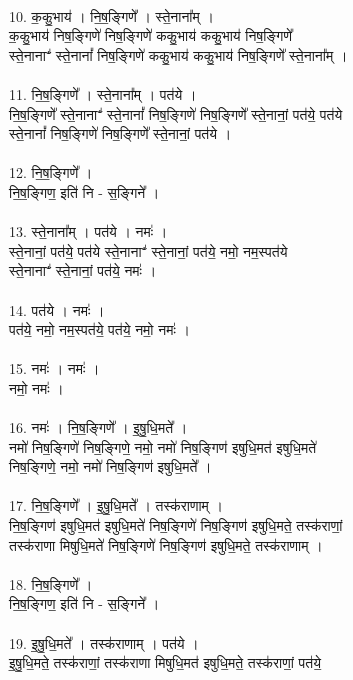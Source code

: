 \\
10. क॒कु॒भाय॑ । नि॒ष॒ङ्गिणे᳚ । स्ते॒नाना᳚म् ।\\
क॒कु॒भाय॑ निष॒ङ्गिणे॑ निष॒ङ्गिणे॑ ककु॒भाय॑ ककु॒भाय॑ निष॒ङ्गिणे᳚\\
स्ते॒नानाꣲ॑ स्ते॒नानां᳚ निष॒ङ्गिणे॑ ककु॒भाय॑ ककु॒भाय॑ निष॒ङ्गिणे᳚ स्ते॒नाना᳚म् ।\\
\\
11. नि॒ष॒ङ्गिणे᳚ । स्ते॒नाना᳚म् । पत॑ये ।\\
नि॒ष॒ङ्गिणे᳚ स्ते॒नानाꣲ॑ स्ते॒नानां᳚ निष॒ङ्गिणे॑ निष॒ङ्गिणे᳚ स्ते॒नानां॒ पत॑ये॒ पत॑ये\\
स्ते॒नानां᳚ निष॒ङ्गिणे॑ निष॒ङ्गिणे᳚ स्ते॒नानां॒ पत॑ये ।\\
\\
12. नि॒ष॒ङ्गिणे᳚ ।\\
नि॒ष॒ङ्गिण॒ इति॑ नि - स॒ङ्गिने᳚ ।\\
\\
13. स्ते॒नाना᳚म् । पत॑ये । नमः॑ ।\\
स्ते॒नानां॒ पत॑ये॒ पत॑ये स्ते॒नानाꣲ॑ स्ते॒नानां॒ पत॑ये॒ नमो॒ नम॒स्पत॑ये\\
स्ते॒नानाꣲ॑ स्ते॒नानां॒ पत॑ये॒ नमः॑ ।\\
\\
14. पत॑ये । नमः॑ ।\\
पत॑ये॒ नमो॒ नम॒स्पत॑ये॒ पत॑ये॒ नमो॒ नमः॑ ।\\
\\
15. नमः॑ । नमः॑ ।\\
नमो॒ नमः॑ ।\\
\\
16. नमः॑ । नि॒ष॒ङ्गिणे᳚ । इ॒षु॒धि॒मते᳚ ।\\
नमो॑ निष॒ङ्गिणे॑ निष॒ङ्गिणे॒ नमो॒ नमो॑ निष॒ङ्गिण॑ इषुधि॒मत॑ इषुधि॒मते॑\\
निष॒ङ्गिणे॒ नमो॒ नमो॑ निष॒ङ्गिण॑ इषुधि॒मते᳚ ।\\
\\
17. नि॒ष॒ङ्गिणे᳚ । इ॒षु॒धि॒मते᳚ । तस्क॑राणाम् ।\\
नि॒ष॒ङ्गिण॑ इषुधि॒मत॑ इषुधि॒मते॑ निष॒ङ्गिणे॑ निष॒ङ्गिण॑ इषुधि॒मते॒ तस्क॑राणां॒\\
तस्क॑राणा मिषुधि॒मते॑ निष॒ङ्गिणे॑ निष॒ङ्गिण॑ इषुधि॒मते॒ तस्क॑राणाम् ।\\
\\
18. नि॒ष॒ङ्गिणे᳚ ।\\
नि॒ष॒ङ्गिण॒ इति॑ नि - स॒ङ्गिने᳚ ।\\
\\
19. इ॒षु॒धि॒मते᳚ । तस्क॑राणाम् । पत॑ये ।\\
इ॒षु॒धि॒मते॒ तस्क॑राणां॒ तस्क॑राणा मिषुधि॒मत॑ इषुधि॒मते॒ तस्क॑राणां॒ पत॑ये॒\\
